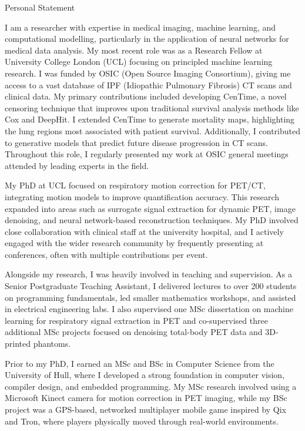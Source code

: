 \documentclass{cv}
\begin{document}
    \begin{rSection}{Personal Statement}
        \item I am a researcher with expertise in medical imaging, machine learning, and computational modelling, particularly in the application of neural networks for medical data analysis. My most recent role was as a Research Fellow at University College London (UCL) focusing on principled machine learning research. I was funded by OSIC (Open Source Imaging Consortium), giving me access to a vast database of IPF (Idiopathic Pulmonary Fibrosis) CT scans and clinical data. My primary contributions included developing CenTime, a novel censoring technique that improves upon traditional survival analysis methods like Cox and DeepHit. I extended CenTime to generate mortality maps, highlighting the lung regions most associated with patient survival. Additionally, I contributed to generative models that predict future disease progression in CT scans. Throughout this role, I regularly presented my work at OSIC general meetings attended by leading experts in the field.

        \item My PhD at UCL focused on respiratory motion correction for PET/CT, integrating motion models to improve quantification accuracy. This research expanded into areas such as surrogate signal extraction for dynamic PET, image denoising, and neural network-based reconstruction techniques. My PhD involved close collaboration with clinical staff at the university hospital, and I actively engaged with the wider research community by frequently presenting at conferences, often with multiple contributions per event.

        \item Alongside my research, I was heavily involved in teaching and supervision. As a Senior Postgraduate Teaching Assistant, I delivered lectures to over 200 students on programming fundamentals, led smaller mathematics workshops, and assisted in electrical engineering labs. I also supervised one MSc dissertation on machine learning for respiratory signal extraction in PET and co-supervised three additional MSc projects focused on denoising total-body PET data and 3D-printed phantoms.

        \item Prior to my PhD, I earned an MSc and BSc in Computer Science from the University of Hull, where I developed a strong foundation in computer vision, compiler design, and embedded programming. My MSc research involved using a Microsoft Kinect camera for motion correction in PET imaging, while my BSc project was a GPS-based, networked multiplayer mobile game inspired by Qix and Tron, where players physically moved through real-world environments.


\end{rSection}
\end{document}
